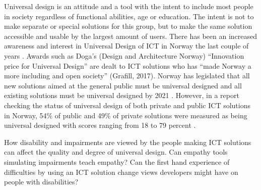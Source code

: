 Universal design is an attitude and a tool with the intent to include most people in society regardless of functional abilities, age or education. The intent is not to make separate or special solutions for this group, but to make the same solution accessible and usable by the largest amount of users. There has been an increased awareness and interest in Universal Design of ICT in Norway the last couple of years \parencite{begnum_universal_2017}. Awards such as Doga’s (Design and Architecture Norway) “Innovation price for Universal Design” are dealt to ICT solutions who has “made Norway a more including and open society” (Grafill, 2017). Norway has legislated that all new solutions aimed at the general public must be universal designed and all existing solutions must be universal designed by 2021 \parencite{ministry_of_children_and_equality_act_2018}. However, in a report checking the status of universal design of both private and public ICT solutions in Norway, 54\% of public and 49\% of private solutions were measured as being universal designed with scores ranging from 18 to 79 percent \parencite{difi_digitale_2015}.

How disability and impairments are viewed by the people making ICT solutions can affect the quality and degree of universal design. Can empathy tools simulating impairments teach empathy? Can the first hand experience of difficulties by using an ICT solution change views developers might have on people with disabilities? 











